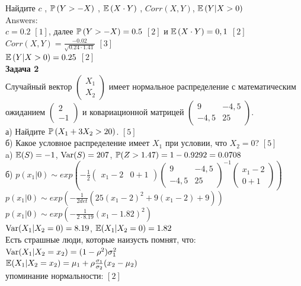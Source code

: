 \documentclass[12pt, a4paper]{article}\usepackage[]{graphicx}\usepackage[]{color}
\begin{document}
	Найдите  $c$ ,  $\P\left(Y>-X\right)$ ,  $\E\left(X\cdot Y
	\right)$ , $Corr(X,Y)$, $\E\left(Y|X>0\right)$ \\
	Answers: \\
	$c=0.2$ $[1]$, далее $\P\left(Y>-X\right)=0.5$ $[2]$ и $\E\left(X\cdot Y\right)=0,1$ $[2]$ \\
	$Corr(X,Y)=\frac{-0.02}{\sqrt{0.24\cdot 1.41}}$ $[3]$ \\
	$\E\left(Y|X>0\right)=0.25$ $[2]$ \\

	\textbf{Задача 2} \\ %
	Случайный вектор  $\left(\begin{array}{c}
	{X_{1} } \\ {X_{2} }
	\end{array}\right)$  имеет нормальное распределение с
	математическим ожиданием  $\left(\begin{array}{c} {2} \\ {-1}
	\end{array}\right)$  и ковариационной матрицей
	$\left(\begin{array}{cc} {9} & {-4,5} \\ {-4,5} & {25}
	\end{array}\right)$. \\
	а) Найдите  $\P\left(X_{1} +3X_{2} >20\right)$. $[5]$ \\
	б) Какое условное распределение имеет $X_{1}$ при условии, что $X_{2}=0$? $[5]$ \\
	a) $\E(S)=-1$, $\Var(S)=207$, $\P(Z>1.47)=1-0.9292=0.0708$ \\
	б) $p(x_{1}|0)\sim exp\left(-\frac{1}{2}\left(\begin{array}{cc} {x_{1}-2} & {0+1} \end{array}\right) \left(\begin{array}{cc} {9} & {-4,5} \\ {-4,5} & {25}
	\end{array}\right)^{-1}\left(\begin{array}{c} {x_{1}-2} \\ {0+1}
	\end{array}\right)\right)$ \\
	$p(x_{1}|0)\sim exp\left(-\frac{1}{2det}(25(x_{1}-2)^{2}+9(x_{1}-2)+9)\right)$ \\
	$p(x_{1}|0)\sim exp\left(-\frac{1}{2\cdot 8.19}(x_{1}-1.82)^{2}\right)$ \\
	$\Var(X_{1}|X_{2}=0)=8.19$, $\E(X_{1}|X_{2}=0)=1.82$ \\
	Есть страшные люди, которые наизусть помнят, что: \\
	$\Var(X_{1}|X_{2}=x_{2})=(1-\rho^{2})\sigma_{1}^{2}$ \\
	$\E(X_{1}|X_{2}=x_{2})=\mu_{1} + \rho\frac{\sigma_{1}}{\sigma_{2}}(x_{2}-\mu_{2})$ \\
	упоминание нормальности: $[2]$ \\
\end{document}
